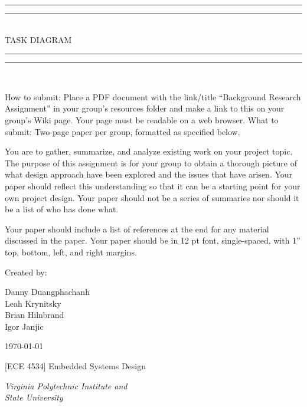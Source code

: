 
\begin{titlepage}

\centering
\vspace*{\baselineskip}

\rule{\textwidth}{1.6pt}\vspace*{-\baselineskip}\vspace*{2pt}
\rule{\textwidth}{0.4pt}\\[\baselineskip]

{\LARGE TASK DIAGRAM}\\[0.2\baselineskip]

\rule{\textwidth}{0.4pt}\vspace*{-\baselineskip}\vspace{3.2pt}
\rule{\textwidth}{1.6pt}\\[\baselineskip]

\wl

\scshape
{\small How to submit: Place a PDF document with the link/title ``Background Research
Assignment'' in your group's resources folder and make a link to this on your
group's Wiki page. Your page must be readable on a web browser. What to submit:
Two-page paper per group, formatted as specified below.

You are to gather, summarize, and analyze existing work on your project topic.
The purpose of this assignment is for your group to obtain a thorough picture of
what design approach have been explored and the issues that have arisen. Your
paper should reflect this understanding so that it can be a starting point for
your own project design. Your paper should not be a series of summaries nor
should it be a list of who has done what.

Your paper should include a list of references at the end for any material
discussed in the paper. Your paper should be in 12 pt font, single-spaced,
with 1'' top, bottom, left, and right margins.
\\[\baselineskip]\par}

\vfill

Created by:\\[0.3\baselineskip]
{Danny Duangphachanh\\ Leah Krynitsky\\ Brian Hilnbrand\\ Igor Janjic\par}
{\small \today\\\par}
{\small [ECE 4534] Embedded Systems Design\\\par}
{\small\itshape Virginia Polytechnic Institute and\\ State University\par}


\end{titlepage}

